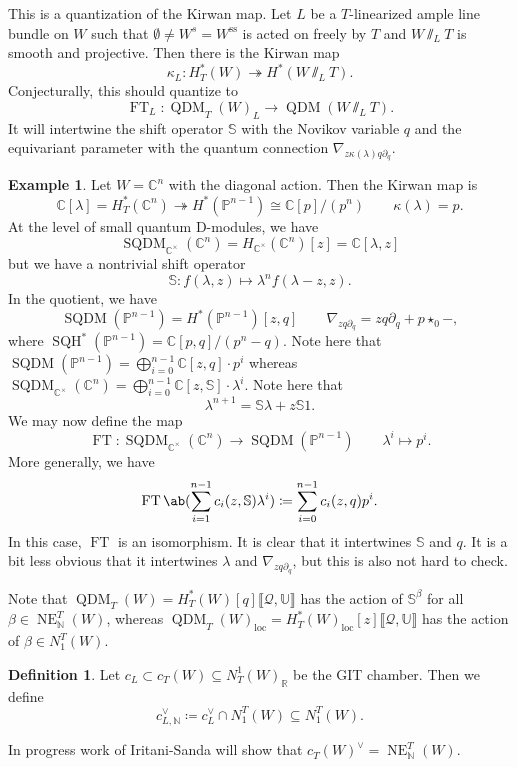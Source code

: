 \documentclass{amsart}
\theoremstyle{definition}
\newtheorem{defn}[thm]{Definition}
\newtheorem{exm}[thm]{Example}
\theoremstyle{remark}
\theoremstyle{plain}
\theoremstyle{definition}
\theoremstyle{remark}
\newcommand{\N}{\mathbb{N}}
\newcommand{\R}{\mathbb{R}}
\newcommand{\C}{\mathbb{C}}
\newcommand{\bS}{\mathbb{S}}
\renewcommand{\P}{\mathbb{P}}
\renewcommand{\mc}[1]{\mathcal{#1}}
\newcommand{\mr}[1]{\mathrm{#1}}
\newcommand{\on}[1]{\operatorname{#1}}
\newcommand{\1}{\mathbf{1}}
\newcommand{\2}{\mathbf{2}}
\newcommand{\3}{\mathbf{3}}
\newcommand{\ps}[1]{\lBrack #1 \rBrack}
\DeclareMathOperator{\QDM}{QDM}
\DeclareMathOperator{\FT}{FT}
\begin{document}
This is a quantization of the Kirwan map. Let \(L\) be a \(T\)-linearized ample line bundle on \(W\) such that \(\emptyset \neq W^s = W^{\mr{ss}}\) is acted on freely by \(T\) and \(W \sslash_L T\) is smooth and projective. Then there is the Kirwan map
\[ \kappa_L \colon H_T^*(W) \twoheadrightarrow H^*(W \sslash_L T). \]
Conjecturally, this should quantize to
\[ \on{FT}_L \colon \QDM_T(W)_L \to \QDM(W \sslash_L T). \]
It will intertwine the shift operator \(\bS\) with the Novikov variable \(q\) and the equivariant parameter with the quantum connection \(\nabla_{z \kappa(\lambda) q \partial_q}\).

\begin{exm}
    Let \(W = \C^n\) with the diagonal action. Then the Kirwan map is
    \[ \C[\lambda] = H_T^*(\C^n) \twoheadrightarrow H^*(\P^{n-1}) \cong \C[p]/(p^n) \qquad \kappa(\lambda) = p. \]
    At the level of small quantum D-modules, we have
    \[ \on{SQDM}_{\C^{\times}}(\C^n) = H_{\C^{\times}}(\C^n)[z] = \C[\lambda, z] \]
    but we have a nontrivial shift operator
    \[ \bS \colon f(\lambda, z) \mapsto \lambda^n f(\lambda - z, z). \]
    In the quotient, we have
    \[ \on{SQDM}(\P^{n-1}) = H^*(\P^{n-1})[z,q] \qquad \nabla_{z q \partial_q} = z q \partial_q + p \star_0 -, \]
    where \(\on{SQH}^*(\P^{n-1}) = \C[p,q]/(p^n-q)\).
    Note here that \(\on{SQDM}(\P^{n-1}) = \bigoplus_{i=0}^{n-1} \C[z,q] \cdot p^i\) whereas \(\on{SQDM}_{\C^{\times}}(\C^n) = \bigoplus_{i=0}^{n-1} \C[z,\bS] \cdot \lambda^i\). Note here that
    \[ \lambda^{n+1} = \bS \lambda + z \bS 1. \]
    We may now define the map
    \[ \on{FT} \colon \on{SQDM}_{\C^{\times}}(\C^n) \to \on{SQDM}(\P^{n-1}) \qquad \lambda^i \mapsto p^i. \]
    More generally, we have
    \[ \FT \ab(\sum_{i=1}^{n-1} c_i(z, \bS) \lambda^i) \coloneqq \sum_{i=0}^{n-1} c_i(z, q) p^i. \]
    In this case, \(\FT\) is an isomorphism. It is clear that it intertwines \(\bS\) and \(q\). It is a bit less obvious that it intertwines \(\lambda\) and \(\nabla_{z q \partial_q}\), but this is also not hard to check.
\end{exm}

Note that \(\QDM_T(W) = H_T^*(W)[q]\ps{\mc{Q}, \mathbb{U}}\) has the action of \(\bS^{\beta}\) for all \(\beta \in \on{NE}_{\N}^T(W)\), whereas \(\QDM_T(W)_{\mr{loc}} = H_T^*(W)_{\mr{loc}}[z]\ps{\mc{Q}, \mathbb{U}}\) has the action of \(\beta \in N_1^T(W)\).

\begin{defn}
    Let \(c_L \subset c_T(W) \subseteq N_T^1(W)_{\R}\) be the GIT chamber. Then we define
    \[ c_{L, \N}^{\vee} \coloneqq c_L^{\vee} \cap N_1^T(W) \subseteq N_1^T(W). \]
\end{defn}
In progress work of Iritani-Sanda will show that \(c_T(W)^{\vee} = \on{NE}_{\N}^T(W)\).
\end{document}
